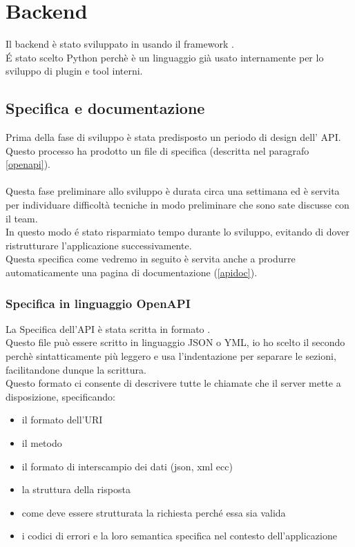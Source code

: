 \chapter{Backend}
        Il backend è stato sviluppato in \cite{Python} usando il framework \cite{Flask}.\\
        \'E stato scelto Python perchè è un linguaggio già usato internamente per lo sviluppo di plugin e tool interni.

        \section{Specifica e documentazione}
            Prima della fase di sviluppo è stata predisposto un periodo di design dell' API.\\
            Questo processo ha prodotto un file di specifica (descritta nel paragrafo 
            \ref{openapi}).\\\\
            Questa fase preliminare allo sviluppo è durata circa una settimana ed è servita per 
            individuare difficoltà tecniche in modo preliminare che sono sate discusse con il team.\\
            In questo modo \'e stato risparmiato tempo durante lo sviluppo, evitando di dover ristrutturare l'applicazione successivamente.\\
            Questa specifica come vedremo in seguito è servita anche a produrre automaticamente una pagina di documentazione (\ref{apidoc}).
            
            \subsection{Specifica in linguaggio OpenAPI\label{openapi}}
                La Specifica dell'API è stata scritta in formato \cite{OpenAPI}.\\
                Questo file può essere scritto in linguaggio JSON o YML, io ho scelto il secondo perchè
                sintatticamente più leggero e usa l'indentazione per separare le sezioni, facilitandone dunque la scrittura. \\
                Questo formato ci consente di descrivere tutte le chiamate che il server 
                mette a disposizione, specificando:
                \begin{itemize}
                    \item il formato dell'URI 
                    \item il metodo
                    \item il formato di interscampio dei dati (json, xml ecc) 
                    \item la struttura della risposta
                    \item come deve essere strutturata la richiesta perch\'e essa sia valida
                        \item i codici di errori e la loro semantica specifica nel contesto dell'applicazione
                \end{itemize}
                
